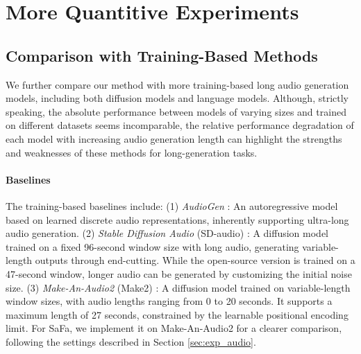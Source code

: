 \section {More Quantitive Experiments}
\subsection{Comparison with Training-Based Methods}
\label{training-based}
We further compare our method with more training-based long audio generation models, including both diffusion models and language models. Although, strictly speaking, the absolute performance between models of varying sizes and trained on different datasets seems incomparable, the relative performance degradation of each model with increasing audio generation length can highlight the strengths and weaknesses of these methods for long-generation tasks.
\vspace{-10pt}
\paragraph{Baselines}
The training-based baselines include: (1) \textit{AudioGen} \cite{kreuk2022audiogen} : An autoregressive model based on learned discrete audio representations, inherently supporting ultra-long audio generation. (2) \textit{Stable Diffusion Audio} (SD-audio) \cite{Evans2024FastTL}: A diffusion model trained on a fixed 96-second window size with long audio, generating variable-length outputs through end-cutting. While the open-source version is trained on a 47-second window, longer audio can be generated by customizing the initial noise size. (3) \textit{Make-An-Audio2} (Make2) \cite{Huang2023MakeAnAudio2T}: A diffusion model trained on variable-length window sizes, with audio lengths ranging from 0 to 20 seconds. It supports a maximum length of 27 seconds, constrained by the learnable positional encoding limit. For SaFa, we implement it on Make-An-Audio2 for a clearer comparison, following the settings described in Section \ref{sec:exp_audio}.









